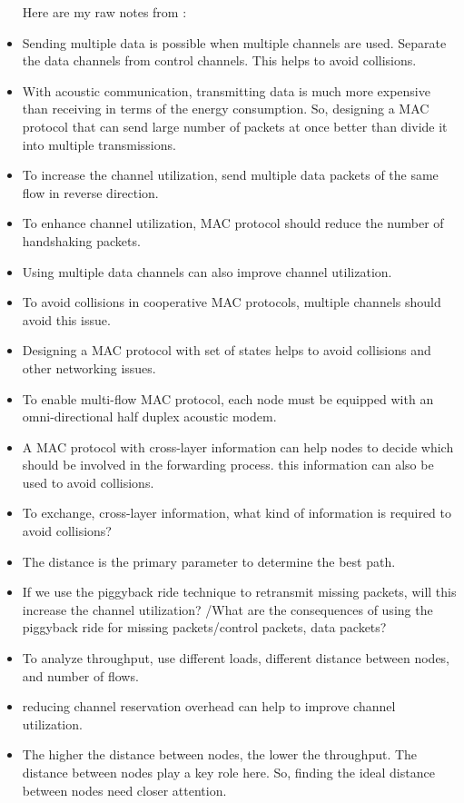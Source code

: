\documentclass{article}
\begin{document}
\begin{itemize}
Here are my raw notes from \cite{Rahman2017}:
  \item Sending multiple data is possible when multiple channels are used. Separate the data channels from control channels. This helps to avoid collisions.
  \item With acoustic communication, transmitting data is much more expensive than receiving in terms of the energy consumption. So, designing a MAC protocol that can send large number of packets at once better than divide it into multiple transmissions.  
  \item To increase the channel utilization, send multiple data packets of the same flow in reverse direction. 
  \item To enhance channel utilization, MAC protocol should reduce the number of handshaking packets.
  \item Using multiple data channels can also improve channel utilization.
  \item To avoid collisions in cooperative MAC protocols, multiple channels should avoid this issue.
  \item Designing a MAC protocol with set of states helps to avoid collisions and other networking issues.
  \item To enable multi-flow MAC protocol, each node must be equipped with an omni-directional half duplex acoustic modem.
  \item A MAC protocol with cross-layer information can help nodes to decide which should be involved in the forwarding process. this information can also be used to avoid collisions. 
  \item To exchange, cross-layer information, what kind of information is required to avoid collisions?
  \item The distance is the primary parameter to determine the best path. 
  \item If we use the piggyback ride technique to retransmit missing packets, will this increase the channel utilization? /What are the consequences of using the piggyback ride for missing packets/control packets, data packets? 
  \item To analyze throughput, use different loads, different distance between nodes, and number of flows.
  \item reducing channel reservation overhead can help to improve channel utilization.
  \item The higher the distance between nodes, the lower the throughput. The distance between nodes play a key role here. So, finding the ideal distance between nodes need closer attention. 

\end{itemize}
\end{document}
